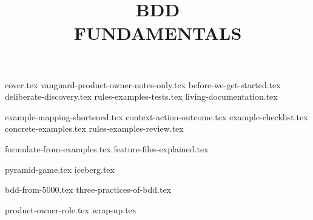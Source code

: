 \documentclass[a4paper,12pt]{report}
\title{BDD\\FUNDAMENTALS}
\begin{document}
{cover.tex}
{vanguard-product-owner-notes-only.tex}
{before-we-get-started.tex}
{deliberate-discovery.tex}
{rules-examples-tests.tex}
{living-documentation.tex}

{example-mapping-shortened.tex}
{context-action-outcome.tex}
{example-checklist.tex}
{concrete-examples.tex}
{rules-examples-review.tex}

{formulate-from-examples.tex}
{feature-files-explained.tex}

{pyramid-game.tex}
{iceberg.tex}

{bdd-from-5000.tex}
{three-practices-of-bdd.tex}

{product-owner-role.tex}
{wrap-up.tex}
\end{document}
